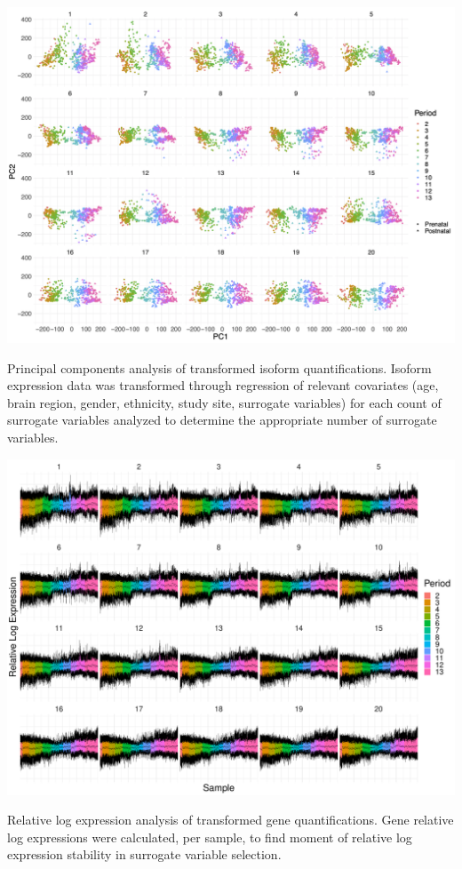 \documentclass[12pt,chapterheads,final]{ucsd}
\begin{document}
\begin{suppfigure}[h]
  \centering
  \includegraphics[width=1\textwidth]{suppfigure3}
  \caption[Principal components analysis of transformed isoform quantifications.]
{Principal components analysis of transformed isoform quantifications. Isoform expression data was transformed through regression of relevant covariates (age, brain region, gender, ethnicity, study site, surrogate variables) for each count of surrogate variables analyzed to determine the appropriate number of surrogate variables.}
\end{suppfigure}

\begin{suppfigure}[h]
  \centering
  \includegraphics[width=1\textwidth]{suppfigure4}
  \caption[Relative log expression analysis of transformed gene quantifications.]
{Relative log expression analysis of transformed gene quantifications. Gene relative log expressions were calculated, per sample, to find moment of relative log expression stability in surrogate variable selection.}
\end{suppfigure}
\end{document}
